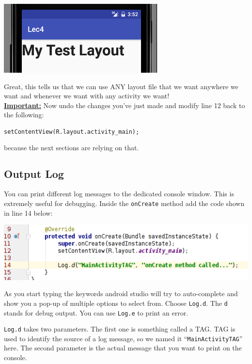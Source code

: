 \begin{center}
	\includegraphics[scale=0.4]{chapters/ch04/images/43}
\end{center}

Great, this tells us that we can use ANY layout file that we want anywhere we want and whenever we want with any activity we want! \\

\underline{\textbf{Important:}} Now undo the changes you've just made and modify line 12 back to the following:

\texttt{setContentView(R.layout.activity\_main);}

because the next sections are relying on that.


\subsection{Output Log}
You can print different log messages to the dedicated console window. This is extremely useful for debugging. Inside the \texttt{onCreate} method add the code shown in line 14 below:

\begin{center}
	\includegraphics[scale=0.4]{chapters/ch04/images/35}
\end{center}

As you start typing the keywords android studio will try to auto-complete and show you a pop-up of multiple options to select from. Choose \texttt{Log.d}. The \texttt{d} stands for debug output. You can use \texttt{Log.e} to print an error. 

\texttt{Log.d} takes two parameters. The first one is something called a TAG. TAG  is used to identify the source of a log message, so we named it ``\texttt{MainActivityTAG}'' here. The second parameter is the actual message that you want to print on the console.

